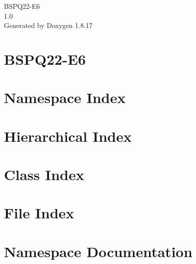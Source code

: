 \let\mypdfximage\pdfximage\def\pdfximage{\immediate\mypdfximage}\documentclass[twoside]{book}
\newcommand{\+}{\discretionary{\mbox{\scriptsize$\hookleftarrow$}}{}{}}
\newcommand{\clearemptydoublepage}{%
  \newpage{\pagestyle{empty}\cleardoublepage}%
}
\begin{document}
\hypersetup{pageanchor=false,
             bookmarksnumbered=true,
             pdfencoding=unicode
            }
\begin{titlepage}
\vspace*{7cm}
\begin{center}%
{\Large B\+S\+P\+Q22-\/\+E6 \\[1ex]\large 1.\+0 }\\
\vspace*{1cm}
{\large Generated by Doxygen 1.8.17}\\
\end{center}
\end{titlepage}
\clearemptydoublepage
{}
\tableofcontents
\clearemptydoublepage
{}
\hypersetup{pageanchor=true}

\chapter{B\+S\+P\+Q22-\/\+E6}
\label{md_git__b_s_p_q22-_e6__r_e_a_d_m_e}

\chapter{Namespace Index}

\chapter{Hierarchical Index}

\chapter{Class Index}

\chapter{File Index}

\chapter{Namespace Documentation}














\end{document}
